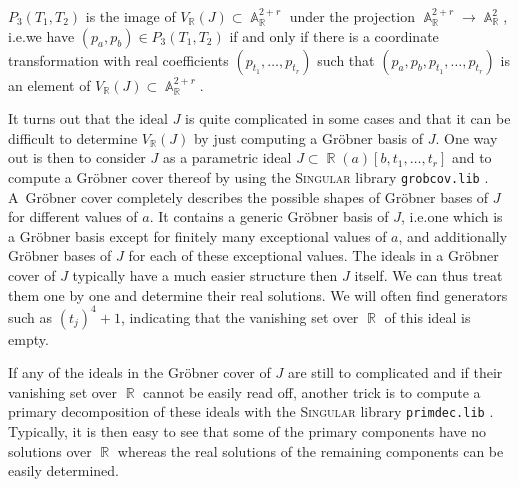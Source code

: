\documentclass[noend]{amsproc}
\theoremstyle{definition}
\newcommand{\Singular}{\textsc{Singular}}
\DeclareMathOperator{\R}{\mathbb{R}}
\DeclareMathOperator{\A}{\mathbb{A}}
\begin{document}
$P_3(T_1, T_2)$ is the image of $V_{\R}(J) \subset \A_{\R}^{2+r}$ under the
projection $\A_{\R}^{2+r} \rightarrow \A_{\R}^2$, i.e.\@ we have
$(p_a, p_b) \in P_3(T_1, T_2)$ if and only if there is a coordinate
transformation with real coefficients $(p_{t_1}, \ldots, p_{t_r})$ such that
$(p_a, p_b, p_{t_1}, \ldots, p_{t_r})$ is an element of
$V_{\R}(J) \subset \A_{\R}^{2+r}$.

It turns out that the ideal $J$ is quite complicated in some cases and that it
can be difficult to determine $V_{\R}(J)$ by just computing a Gr\"obner basis
of $J$. One way out is then to consider $J$ as a parametric ideal
$J \subset \R(a)[b,t_1,\ldots,t_r]$ and to compute a Gr\"obner cover thereof
by using the \Singular{} library \verb+grobcov.lib+ \citep{grobcov}.
A~Gr\"obner cover completely describes the possible shapes of Gr\"obner bases
of $J$ for different values of $a$. It contains a generic Gr\"obner basis of
$J$, i.e.\@ one which is a Gr\"obner basis except for finitely many exceptional
values of $a$, and additionally Gr\"obner bases of $J$ for each of these
exceptional values. The ideals in a Gr\"obner cover of $J$ typically have a
much easier structure then $J$ itself. We can thus treat them one by one and
determine their real solutions. We will often find generators such as
$(t_j)^4+1$, indicating that the vanishing set over $\R$ of this ideal is
empty.

If any of the ideals in the Gr\"obner cover of $J$ are still to complicated and
if their vanishing set over $\R$ cannot be easily read off, another trick is to
compute a primary decomposition of these ideals with the \Singular{} library
\verb+primdec.lib+ \citep{primdec}. Typically, it is then easy to see that some
of the primary components have no solutions over $\R$ whereas the real
solutions of the remaining components can be easily determined.
\end{document}
